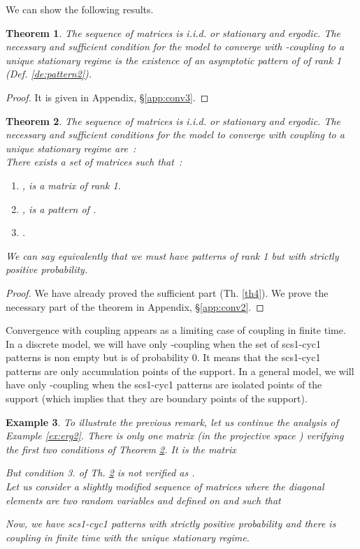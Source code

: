 \documentclass[11pt,titlepage]{article}
\newtheorem{theo}{Theorem }[section]
\newtheorem{example}[theo]{Example }
\newenvironment{exam}{\begin{example}\rm}{\end{example}}
\begin{document}
We can show the following results.

\begin{theo}
The sequence of matrices  is  i.i.d. or stationary and ergodic. The
necessary and sufficient condition for the 
model to converge with -coupling to 
a unique stationary regime is the existence of
an asymptotic pattern  of 
 of rank 1 (Def. \ref{de:pattern2}).
\label{conv3}
\end{theo}
\begin{proof} It is given in Appendix, \S \ref{app:conv3}.
\end{proof}

\begin{theo}
The sequence of matrices  is  i.i.d. or stationary and ergodic. The
necessary and sufficient conditions for the 
model to converge with coupling to 
a unique stationary regime are~:\\
There exists a set  of matrices such that~:
\begin{enumerate}
\item ,  is a matrix of rank 1.
\item ,  is a pattern of .
\item .
\end{enumerate}
We can say equivalently that we must have patterns of rank 1
but with 
strictly positive probability. 
\label{conv2}
\end{theo}

\begin{proof} We have already proved the sufficient part (Th. \ref{th4}).
We prove the necessary part of the theorem in Appendix, 
\S \ref{app:conv2}.
\end{proof} 

Convergence with coupling appears as a limiting case of
coupling in finite time. 
In a discrete model,
we will have only 
-coupling when the set  of  scs1-cyc1 patterns is non empty
but is of 
probability 0. It means that the scs1-cyc1 patterns are only accumulation
points of the 
support. In a general model, we will 
have only  
-coupling when the scs1-cyc1 patterns are isolated points
of the support 
(which implies that they 
are boundary 
points of the support). 

\begin{exam}
\label{ex:erg3}
To illustrate the previous remark, let us continue the analysis of Example
\ref{ex:erg2}. 
There is only one matrix
(in the projective space )
verifying the first two conditions of Theorem 
\ref{conv2}. It is the matrix 
  
But condition 3. of Th. \ref{conv2} is not verified as . \\
Let us consider a slightly modified sequence of matrices 
where the 
diagonal elements are two random variables  and  defined 
on  and such that
  
Now, we have scs1-cyc1 patterns with strictly positive probability and there is
coupling in 
finite time with the unique stationary regime. 
\end{exam}
\end{document}
